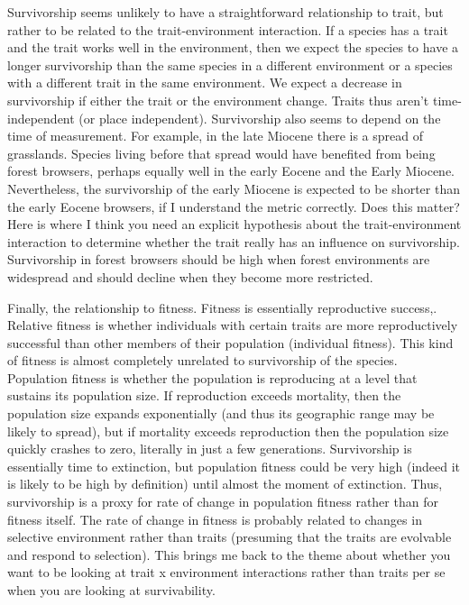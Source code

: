 \documentclass{article}
\begin{document}
Survivorship seems unlikely to have a straightforward relationship to trait, but rather to be related to the trait-environment interaction.  If a species has a trait and the trait works well in the environment, then we expect the species to have a longer survivorship than the same species in a different environment or a species with a different trait in the same environment.  We expect a decrease in survivorship if either the trait or the environment change.  Traits thus aren’t time-independent (or place independent).  Survivorship also seems to depend on the time of measurement.  For example, in the late Miocene there is a spread of grasslands.  Species living before that spread would have benefited from being forest browsers, perhaps equally well in the early Eocene and the Early Miocene.  Nevertheless, the survivorship of the early Miocene is expected to be shorter than the early Eocene browsers, if I understand the metric correctly.  Does this matter?  Here is where I think you need an explicit hypothesis about the trait-environment interaction to determine whether the trait really has an influence on survivorship.  Survivorship in forest browsers should be high when forest environments are widespread and should decline when they become more restricted.

Finally, the relationship to fitness.  Fitness is essentially reproductive success,.  Relative fitness is whether individuals with certain traits are more reproductively successful than other members of their population (individual fitness).  This kind of fitness is almost completely unrelated to survivorship of the species.  Population fitness is whether the population is reproducing at a level that sustains its population size.  If reproduction exceeds mortality, then the population size expands exponentially (and thus its geographic range may be likely to spread), but if mortality exceeds reproduction then the population size quickly crashes to zero, literally in just a few generations.  Survivorship is essentially time to extinction, but population fitness could be very high (indeed it is likely to be high by definition) until almost the moment of extinction.  Thus, survivorship is a proxy for rate of change in population fitness rather than for fitness itself.  The rate of change in fitness is probably related to changes in selective environment rather than traits (presuming that the traits are evolvable and respond to selection).  This brings me back to the theme about whether you want to be looking at trait x environment interactions rather than traits per se when you are looking at survivability. 
\end{document}
